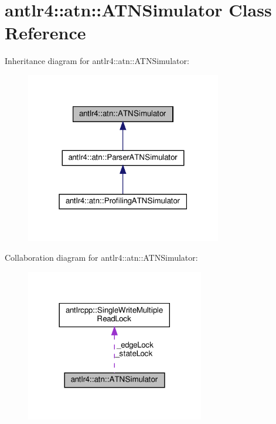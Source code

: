 \hypertarget{classantlr4_1_1atn_1_1ATNSimulator}{}\section{antlr4\+:\+:atn\+:\+:A\+T\+N\+Simulator Class Reference}
\label{classantlr4_1_1atn_1_1ATNSimulator}


Inheritance diagram for antlr4\+:\+:atn\+:\+:A\+T\+N\+Simulator\+:
\nopagebreak
\begin{figure}[H]
\begin{center}
\leavevmode
\includegraphics[width=243pt]{classantlr4_1_1atn_1_1ATNSimulator__inherit__graph}
\end{center}
\end{figure}


Collaboration diagram for antlr4\+:\+:atn\+:\+:A\+T\+N\+Simulator\+:
\nopagebreak
\begin{figure}[H]
\begin{center}
\leavevmode
\includegraphics[width=221pt]{classantlr4_1_1atn_1_1ATNSimulator__coll__graph}
\end{center}
\end{figure}
